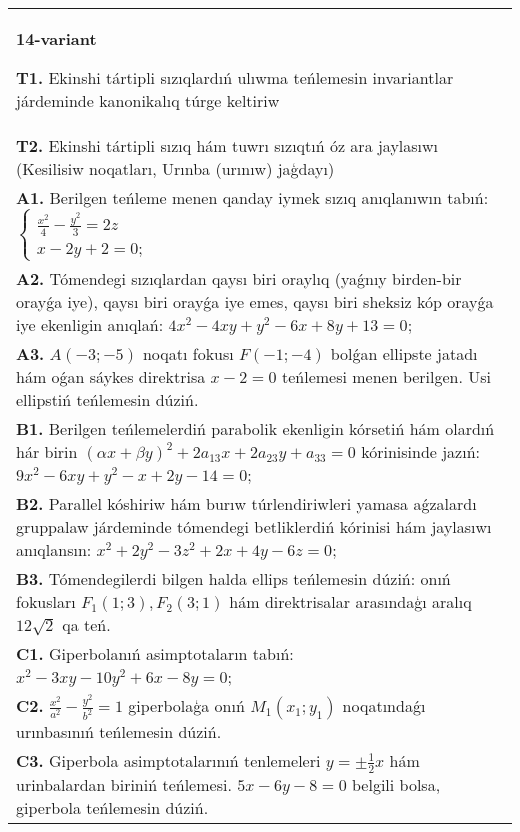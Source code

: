 \documentclass{article}
\begin{document}
\begin{tabular}{m{17cm}}
\textbf{14-variant}
\newline

\textbf{T1.} Ekinshi tártipli sızıqlardıń ulıwma teńlemesin invariantlar járdeminde kanonikalıq túrge keltiriw \\
\textbf{T2.} Ekinshi tártipli sızıq hám tuwrı sızıqtıń óz ara jaylasıwı (Kesilisiw noqatları, Urınba (urınıw) jaģdayı) \\
\textbf{A1.} Berilgen teńleme menen qanday iymek sızıq anıqlanıwın tabıń: $\left\{\begin{array}{l}\frac{x^2}{4}-\frac{y^2}{3}=2 z \\ x-2 y+2=0 ;\end{array}\right.$ \\
\textbf{A2.} Tómendegi sızıqlardan qaysı biri oraylıq (yaǵnıy birden-bir orayǵa iye), qaysı biri orayǵa iye emes, qaysı biri sheksiz kóp orayǵa iye ekenligin anıqlań: $4 x^2-4 x y+y^2-6 x+8 y+13=0$; \\
\textbf{A3.} $A (-3;-5) $ noqatı fokusı $F (-1;-4) $ bolǵan ellipste jatadı hám oǵan sáykes direktrisa $x-2=0$ teńlemesi menen berilgen. Usi ellipstiń teńlemesin dúziń. \\
\textbf{B1.} Berilgen teńlemelerdiń parabolik ekenligin kórsetiń hám olardıń hár birin $(\alpha x+\beta y)^2+2 a_{13} x+2 a_{23} y+a_{33}=0$ kórinisinde jazıń: $9 x^2-6 x y+y^2-x+2 y-14=0$; \\
\textbf{B2.} Parallel kóshiriw hám burıw túrlendiriwleri yamasa aǵzalardı gruppalaw járdeminde tómendegi betliklerdiń kórinisi hám jaylasıwı anıqlansın: $x^2+2 y^2-3 z^2+2 x+4 y-6 z=0$; \\
\textbf{B3.} Tómendegilerdi bilgen halda ellips teńlemesin dúziń: onıń fokusları $F_1 (1; 3), F_2 (3; 1) $ hám direktrisalar arasındaģı aralıq $12 \sqrt{2}$ qa teń. \\
\textbf{C1.} Giperbolanıń asimptotaların tabıń: $x^2-3 x y-10 y^2+6 x-8 y=0$; \\
\textbf{C2.} $\frac{x^2}{a^2}-\frac{y^2}{b^2}=1$ giperbolaģa onıń $M_1\left(x_1; y_1\right) $ noqatındaǵı urınbasınıń teńlemesin dúziń. \\
\textbf{C3.} Giperbola asimptotalarınıń tenlemeleri $y= \pm \frac{1}{2} x$ hám urinbalardan biriniń teńlemesi. $5 x-6 y-8=0$ belgili bolsa, giperbola teńlemesin dúziń. \\

\end{tabular}
\vspace{1cm}
\end{document}
